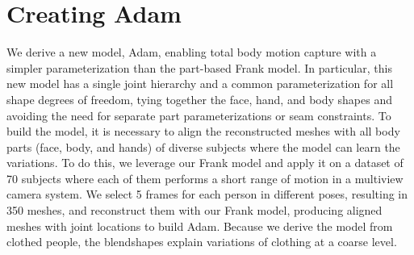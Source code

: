 \section{Creating Adam}
We derive a new model, Adam, enabling total body motion capture with a simpler parameterization than the part-based Frank model. In particular, this new model has a single joint hierarchy and a common parameterization for all shape degrees of freedom, tying together the face, hand, and body shapes and avoiding the need for separate part parameterizations or seam constraints. To build the model, it is necessary to align the reconstructed meshes with all body parts (face, body, and hands) of diverse subjects where the model can learn the variations. To do this, we leverage our Frank model and apply it on a dataset of 70 subjects where each of them performs a short range of motion in a multiview camera system. We select 5 frames for each person in different poses, resulting in 350 meshes, and reconstruct them with our Frank model, producing aligned meshes with joint locations to build Adam. Because we derive the model from clothed people, the blendshapes explain variations of clothing at a coarse level.%




